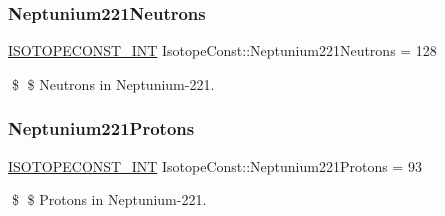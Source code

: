 \subsubsection{\texorpdfstring{Neptunium221\+Neutrons}{Neptunium221Neutrons}}
{\footnotesize\ttfamily \mbox{\hyperlink{group___isotope_const-_macros_ga5f18360b3e99483a35c32d789e62621c}{I\+S\+O\+T\+O\+P\+E\+C\+O\+N\+S\+T\+\_\+\+I\+NT}} Isotope\+Const\+::\+Neptunium221\+Neutrons = 128}

\$ \$ Neutrons in Neptunium-\/221. \mbox{\label{group___isotope_const-_neptunium-_np221_ga64dcd9578829203c20e1f5b41e9e4876}} 
\subsubsection{\texorpdfstring{Neptunium221\+Protons}{Neptunium221Protons}}
{\footnotesize\ttfamily \mbox{\hyperlink{group___isotope_const-_macros_ga5f18360b3e99483a35c32d789e62621c}{I\+S\+O\+T\+O\+P\+E\+C\+O\+N\+S\+T\+\_\+\+I\+NT}} Isotope\+Const\+::\+Neptunium221\+Protons = 93}

\$ \$ Protons in Neptunium-\/221. 